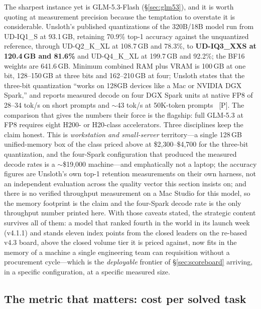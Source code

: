 The sharpest instance yet is GLM-5.3-Flash (\S\ref{sec:glm53}), and it is worth quoting at measurement precision because the temptation to overstate it is considerable. Unsloth's published quantizations of the 320B/18B model run from UD-IQ1\_S at 93.1\,GB, retaining 70.9\% top-1 accuracy against the unquantized reference, through UD-Q2\_K\_XL at 108.7\,GB and 78.3\%, to \textbf{UD-IQ3\_XXS at 120.4\,GB and 81.6\%} and UD-Q4\_K\_XL at 199.7\,GB and 92.2\%; the BF16 weights are 641.6\,GB. Minimum combined RAM plus VRAM is 100\,GB at one bit, 128--150\,GB at three bits and 162--210\,GB at four; Unsloth states that the three-bit quantization ``works on 128GB devices like a Mac or NVIDIA DGX Spark,'' and reports measured decode on four DGX Spark units at native FP8 of 28--34 tok/s on short prompts and $\sim$43 tok/s at 50K-token prompts~\cite{glm53-local} [P]. The comparison that gives the numbers their force is the flagship: full GLM-5.3 at FP8 requires eight H200- or H20-class accelerators. Three disciplines keep the claim honest. This is \emph{workstation and small-server} territory---a single 128\,GB unified-memory box of the class priced above at \$2,300--\$4,700 for the three-bit quantization, and the four-Spark configuration that produced the measured decode rates is a $\sim$\$19{,}000 machine---and emphatically not a laptop; the accuracy figures are Unsloth's own top-1 retention measurements on their own harness, not an independent evaluation across the quality vector this section insists on; and there is no verified throughput measurement on a Mac Studio for this model, so the memory footprint is the claim and the four-Spark decode rate is the only throughput number printed here. With those caveats stated, the strategic content survives all of them: a model that ranked fourth in the world in its launch week (v4.1.1) and stands eleven index points from the closed leaders on the re-based v4.3 board, above the closed volume tier it is priced against, now fits in the memory of a machine a single engineering team can requisition without a procurement cycle---which is the \emph{deployable} frontier of \S\ref{sec:scoreboard} arriving, in a specific configuration, at a specific measured size.

\subsection{The metric that matters: cost per solved task}
\label{sec:cost-solved}

